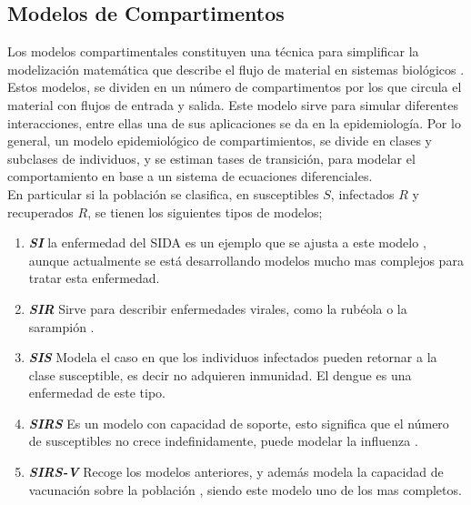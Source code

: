 \documentclass[journal]{IEEEtran}
\begin{document}
\subsection{Modelos de Compartimentos}\label{Modelos}
Los modelos compartimentales constituyen una técnica para simplificar la modelización matemática que describe el flujo de material en sistemas biológicos \cite{compartimientos}. 
Estos modelos, se dividen en un número de compartimentos por los que circula el material con flujos de entrada y salida. Este modelo 
sirve para simular diferentes interacciones, entre ellas una de sus aplicaciones se da en la epidemiología. Por lo general, un modelo 
epidemiológico de compartimientos, se divide en clases y subclases de individuos, y se estiman tases de transición, para modelar el comportamiento
en base a un sistema de ecuaciones diferenciales.\\ 
\newline
En particular si la población se clasifica, en susceptibles $S$, infectados $R$ y recuperados $R$, se tienen los siguientes tipos de modelos;
\begin{enumerate}
  \item \textbf{\textit{SI}} la enfermedad del SIDA es un ejemplo que se ajusta a este modelo \cite{SIDA}, aunque actualmente se está desarrollando modelos mucho mas complejos para tratar esta enfermedad.
  \item \textbf{\textit{SIR}} Sirve para describir enfermedades virales, como la rubéola o la sarampión \cite{Rubeola}. 
  \item \textbf{\textit{SIS}} Modela el caso en que los individuos infectados pueden retornar a la clase susceptible, es decir no adquieren inmunidad. El dengue \cite{Dengue} es una enfermedad de este tipo.
  \item \textbf{\textit{SIRS}} Es un modelo con capacidad de soporte, esto significa que el número de susceptibles no crece indefinidamente, puede modelar la influenza \cite{Influenza}.
  \item \textbf{\textit{SIRS-V}} Recoge los modelos anteriores, y además modela la capacidad de vacunación sobre la población \cite{Vacunacion}, siendo este modelo uno de los mas completos.
\end{enumerate}
\end{document}
